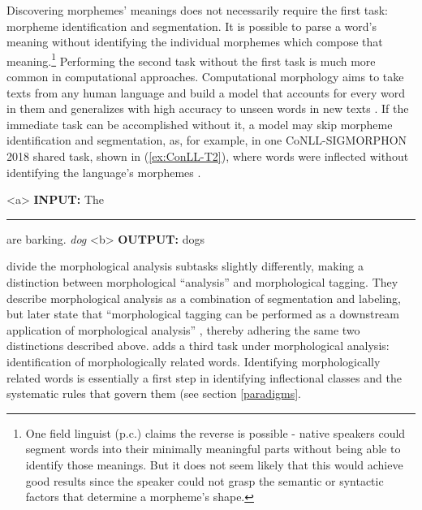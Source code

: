 \documentclass[12pt]{article}
\begin{document}
Discovering morphemes' meanings does not necessarily require the first task: morpheme identification and segmentation. It is possible to parse a word's meaning without identifying the individual morphemes which compose that meaning.\footnote{One field linguist (p.c.) claims the reverse is possible - native speakers could segment words into their minimally meaningful parts without being able to identify those meanings.  But it does not seem likely that this would achieve good results since the speaker could not grasp the semantic or syntactic factors that determine a morpheme’s shape.} Performing the second task without the first task is much more common in computational approaches. Computational morphology aims to take texts from any human language and build a model that accounts for every word in them and generalizes with high accuracy to unseen words in new texts \cite{goldsmith_computational_2017}. If the immediate task can be accomplished without it, a model may skip morpheme identification and segmentation, as, for example, in one CoNLL-SIGMORPHON 2018 shared task, shown in (\ref{ex:ConLL-T2}), where words were inflected without identifying the language's morphemes \cite{cotterell_conllsigmorphon_2018}.

\begin{singlespace}
\label{ex:ConLL-T2}
\a<a> \textbf{INPUT:}  The \rule{1cm}{0.15mm} are barking.  \hspace{5 mm} \textit{dog}
\label{ex:ConLL-T2a}
\a<b> \textbf{OUTPUT:} dogs
\label{ex:ConLL-T2b}
\xe
\end{singlespace}

 divide the morphological analysis subtasks slightly differently, making a distinction between morphological “analysis” and morphological tagging. They describe morphological analysis as a combination of segmentation and labeling, but later state that ``morphological tagging can be performed as a downstream application of morphological analysis'' , thereby adhering the same two distinctions described above.  adds a third task under morphological analysis: identification of morphologically related words. Identifying morphologically related words is essentially a first step in identifying inflectional classes and the systematic rules that govern them (see section \ref{paradigms}. 
\end{document}
